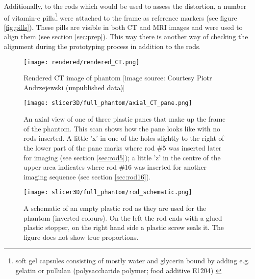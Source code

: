 Additionally, to the rods which would be used to assess the distortion, a number of vitamin-e pills\footnote{soft gel capsules consisting of mostly water and glycerin bound by adding e.g. gelatin or pullulan (polysaccharide polymer; food additive E1204) \cite{pillshere}} were attached to the frame as reference markers (see figure \ref{fig:pills}).
These pills are visible in both CT and MRI images and were used to align them (see section \ref{sec:prep}).
This way there is another way of checking the alignment during the prototyping process in addition to the rods.


\begin{figure}[!bp]
\centering
\texttt{[image: rendered/rendered\_CT.png]}
\caption{Rendered CT image of phantom [image source: Courtesy Piotr Andrzejewski (unpublished data)]}
\label{fig:rendered_CT}
\end{figure}


\begin{figure}[!tbp]
\centering
\texttt{[image: slicer3D/full\_phantom/axial\_CT\_pane.png]}
\caption{An axial view of one of three plastic panes that make up the frame of the phantom. This scan shows how the pane looks like with no rods inserted. A little 'x' in one of the holes slightly to the right of the lower part of the pane marks where rod \#5 was inserted later for imaging (see section \ref{sec:rod5}); a little 'z' in the centre of the upper area indicates where rod \#16 was inserted for another imaging sequence (see section \ref{sec:rod16}).}
\label{fig:axial_CT_pane}
\end{figure}

\begin{figure}[!tbp]
\centering
\texttt{[image: slicer3D/full\_phantom/rod\_schematic.png]}
\caption{A schematic of an empty plastic rod as they are used for the phantom (inverted colours). On the left the rod ends with a glued plastic stopper, on the right hand side a plastic screw seals it. The figure does not show true proportions.}
\label{fig:rod_schematic}
\end{figure}


